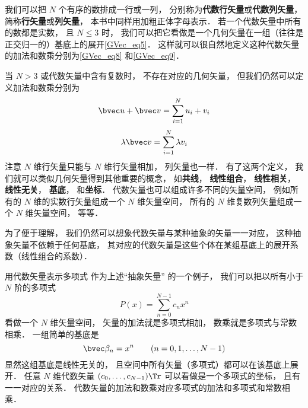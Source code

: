 

我们可以把 $N$ 个有序的数排成一行或一列， 分别称为\textbf{代数行矢量}或\textbf{代数列矢量}， 简称\textbf{行矢量}或\textbf{列矢量}， 本书中同样用加粗正体字母表示． 若一个代数矢量中所有的数都是实数， 且 $N \leqslant 3$%
时， 我们可以把它看做是一个几何矢量在一组（往往是正交归一的）基底上的展开\autoref{GVec_eq5}． 这样就可以很自然地定义这种代数矢量的加法和数乘分别为\autoref{GVec_eq8} 和\autoref{GVec_eq9}．

当 $N > 3$ 或代数矢量中含有复数时， 不存在对应的几何矢量， 但我们仍然可以定义加法和数乘分别为
\begin{equation}
\bvec u + \bvec v = \sum_{i = 1}^N u_i + v_i
\end{equation}
\begin{equation}
\lambda \bvec v = \sum_{i = 1}^N \lambda v_i
\end{equation}
注意 $N$ 维行矢量只能与 $N$ 维行矢量相加， 列矢量也一样． 有了这两个定义， 我们就可以类似几何矢量得到其他重要的概念， 如\textbf{共线}， \textbf{线性组合}， \textbf{线性相关}， \textbf{线性无关}， \textbf{基底}， 和\textbf{坐标}． 代数矢量也可以组成许多不同的矢量空间， 例如所有的 $N$ 维的实数行矢量组成一个 $N$ 维矢量空间， 所有的 $N$ 维复数列矢量组成一个 $N$ 维矢量空间， 等等．

为了便于理解， 我们仍然可以想象代数矢量与某种抽象的矢量一一对应， 这种抽象矢量不依赖于任何基底， 其对应的代数矢量是这些个体在某组基底上的展开系数（线性组合的系数）．

\begin{example}{用代数矢量表示多项式}
作为上述“抽象矢量” 的一个例子， 我们可以把以所有小于 $N$ 阶的多项式
\begin{equation}
P(x) = \sum_{n = 0}^{N-1} c_n x^n
\end{equation}
看做一个 $N$ 维矢量空间， 矢量的加法就是多项式相加， 数乘就是多项式与常数相乘． 一组简单的基底是
\begin{equation}
\bvec \beta_n = x^n \qquad (n = 0, 1, \dots, N-1)
\end{equation}
显然这组基底是线性无关的， 且空间中所有矢量（多项式）都可以在该基底上展开． 任意 $N$ 维代数矢量 $(c_0, \dots, c_{N-1})\Tr$ 可以看做是一个多项式的坐标， 且有一一对应的关系． 代数矢量的加法和数乘对应多项式的加法和多项式和常数相乘．
\end{example}

